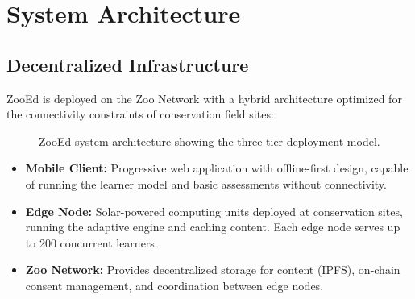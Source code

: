 \section{System Architecture}

\label{sec:architecture}

\subsection{Decentralized Infrastructure}

ZooEd is deployed on the Zoo Network with a hybrid architecture optimized for the connectivity constraints of conservation field sites:

\begin{figure}[H]
\centering
{}
\caption{ZooEd system architecture showing the three-tier deployment model.}
\label{fig:architecture}
\end{figure}

\begin{itemize}[leftmargin=*]
    \item \textbf{Mobile Client:} Progressive web application with offline-first design, capable of running the learner model and basic assessments without connectivity.
    \item \textbf{Edge Node:} Solar-powered computing units deployed at conservation sites, running the adaptive engine and caching content. Each edge node serves up to 200 concurrent learners.
    \item \textbf{Zoo Network:} Provides decentralized storage for content (IPFS), on-chain consent management, and coordination between edge nodes.
\end{itemize}

